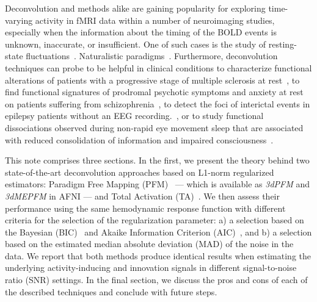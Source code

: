 Deconvolution and methods alike are gaining popularity for exploring time-varying activity in fMRI data within a number of neuroimaging studies, especially when the information about the timing of the BOLD events is unknown, inaccurate, or insufficient. One of such cases is the study of resting-state fluctuations~\cite{petridou2013PeriodsRestFMRI,karahanoglu2015TransientBrainActivity,karahanoglu2017DynamicsLargescaleFMRI,kinany2020DynamicFunctionalConnectivity,gonzalez-castillo2019ImagingSpontaneousFlow,allan2015FunctionalConnectivityMRI, zamaniesfahlani2020HighamplitudeCofluctuationsCortical}. Naturalistic paradigms~\cite{betzel2020TemporalFluctuationsBrain,faskowitz2020EdgecentricFunctionalNetwork}. Furthermore, deconvolution techniques can probe to be helpful in clinical conditions to characterize functional alterations of patients with a progressive stage of multiple sclerosis at rest~\cite{bommarito2020FunctionalNetworkDynamicsa}, to find functional signatures of prodromal psychotic symptoms and anxiety at rest on patients suffering from schizophrenia~\cite{zoller2019LargeScaleBrainNetwork}, to detect the foci of interictal events in epilepsy patients without an EEG recording.~\cite{lopes2012DetectionEpilepticActivity}, or to study functional dissociations observed during non-rapid eye movement sleep that are associated with reduced consolidation of information and impaired consciousness~\cite{tarun2021NREMSleepStagesa}.

This note comprises three sections. In the first, we present the theory behind two state-of-the-art deconvolution approaches based on L1-norm regularized estimators: Paradigm Free Mapping (PFM)~\cite{caballerogaudes2013ParadigmFreeMapping} --- which is available as \textit{3dPFM} and \textit{3dMEPFM} in AFNI --- and Total Activation (TA)~\cite{karahanoglu2013TotalActivationFMRI}. We then assess their performance using the same hemodynamic response function with different criteria for the selection of the regularization parameter: a) a selection based on the Bayesian (BIC)~\cite{schwarz1978EstimatingDimensionModel} and Akaike Information Criterion (AIC)~\cite{akaike1998InformationTheoryExtension}, and b) a selection based on the estimated median absolute deviation (MAD) of the noise in the data. We report that both methods produce identical results when estimating the underlying activity-inducing and innovation signals in different signal-to-noise ratio (SNR) settings. In the final section, we discuss the pros and cons of each of the described techniques and conclude with future steps.